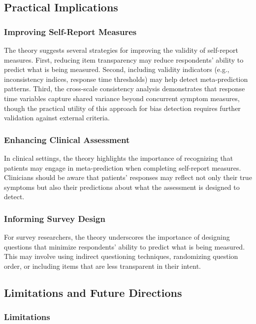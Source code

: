 \documentclass[10pt,twocolumn]{article}
\begin{document}
\subsection{Practical Implications}

\subsubsection{Improving Self-Report Measures}

The theory suggests several strategies for improving the validity of self-report measures. First, reducing item transparency may reduce respondents' ability to predict what is being measured. Second, including validity indicators (e.g., inconsistency indices, response time thresholds) may help detect meta-prediction patterns. Third, the cross-scale consistency analysis demonstrates that response time variables capture shared variance beyond concurrent symptom measures, though the practical utility of this approach for bias detection requires further validation against external criteria.

\subsubsection{Enhancing Clinical Assessment}

In clinical settings, the theory highlights the importance of recognizing that patients may engage in meta-prediction when completing self-report measures. Clinicians should be aware that patients' responses may reflect not only their true symptoms but also their predictions about what the assessment is designed to detect.

\subsubsection{Informing Survey Design}

For survey researchers, the theory underscores the importance of designing questions that minimize respondents' ability to predict what is being measured. This may involve using indirect questioning techniques, randomizing question order, or including items that are less transparent in their intent.

\subsection{Limitations and Future Directions}

\subsubsection{Limitations}
\end{document}
